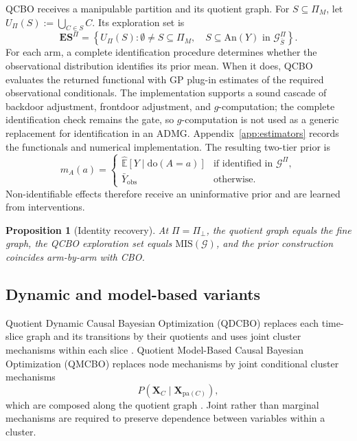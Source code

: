 \documentclass[twoside]{article}
\newtheorem{proposition}{Proposition}
\newcommand{\E}{\mathbb{E}}
\newcommand{\doo}{\mathrm{do}}
\newcommand{\An}{\mathrm{An}}
\newcommand{\Gg}{\mathcal{G}}
\newcommand{\Gq}{\mathcal{G}^{\Pi}}
\newcommand{\ESpi}{\mathbf{ES}^{\Pi}}
\begin{document}
QCBO receives a manipulable partition and its quotient graph. For
$S\subseteq\Pi_M$, let $U_\Pi(S):=\bigcup_{C\in S}C$. Its exploration set
is
\begin{equation}
 \ESpi=\left\{U_\Pi(S):
 \emptyset\ne S\subseteq\Pi_M,\quad
 S\subseteq\An(Y)\text{ in }\Gq_{\bar S}\right\}.
 \label{eq:qcbo-arms}
\end{equation}
For each arm, a complete identification procedure determines whether the
observational distribution identifies its prior mean. When it does, QCBO
evaluates the returned functional with GP plug-in estimates of the required
observational conditionals. The implementation supports a sound cascade of
backdoor adjustment, frontdoor adjustment, and $g$-computation; the complete
identification check remains the gate, so $g$-computation is not used as a
generic replacement for identification in an ADMG. Appendix~\ref{app:estimators}
records the functionals and numerical implementation. The resulting two-tier
prior is
\begin{equation}
  m_A(a)=
  \begin{cases}
    \widehat{\E}[Y\mid\doo(A=a)] & \text{if identified in }\Gq,\\
    \bar Y_{\mathrm{obs}} & \text{otherwise.}
  \end{cases}
  \label{eq:two-tier-prior}
\end{equation}
Non-identifiable effects therefore receive an uninformative prior and are
learned from interventions.

\begin{proposition}[Identity recovery]
\label{prop:identity}
At $\Pi=\Pi_\bot$, the quotient graph equals the fine graph, the QCBO
exploration set equals $\mathrm{MIS}(\Gg)$, and the prior construction
coincides arm-by-arm with CBO.
\end{proposition}

\subsection{Dynamic and model-based variants}

Quotient Dynamic Causal Bayesian Optimization (QDCBO) replaces each
time-slice graph and its transitions by their quotients and uses joint
cluster mechanisms within each slice
\citep{agliettiDynamicCausalBayesian2021a}. Quotient Model-Based Causal
Bayesian Optimization (QMCBO) replaces node mechanisms by joint conditional
cluster mechanisms
\[
 P(\mathbf X_C\mid\mathbf X_{\mathrm{pa}(C)}),
\]
which are composed along the quotient graph
\citep{sussexMODELBASEDCAUSALBAYESIAN2023}. Joint rather than marginal
mechanisms are required to preserve dependence between variables within a
cluster.
\end{document}
